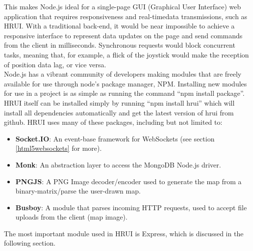 This makes Node.js ideal for a single-page GUI (Graphical User Interface) web application that requires responsiveness and 
real-timedata transmissions, such as HRUI. With a traditional back-end, it would be near impossible to achieve a responsive
interface to represent data updates on the page and send commands from the client in milliseconds. Synchronous requests would
block concurrent tasks, meaning that, for example, a flick of the joystick would make the reception of position data lag, or
vice versa.\\

Node.js has a vibrant community of developers making modules that are freely available for use through node's package manager,
NPM. Installing new modules for use in a project is as simple as running the command ``npm install package''. HRUI itself can
be installed simply by running ``npm install hrui'' which will install all dependencies automatically and get the latest
version of hrui from github. HRUI uses many of these packages, including but not limited to:
\begin{itemize}
  \item \textbf{Socket.IO}: An event-base framework for WebSockets (see section \ref{html5websockets} for more).
  \item \textbf{Monk}: An abstraction layer to access the MongoDB Node.js driver.
  \item \textbf{PNGJS}: A PNG Image decoder/encoder used to generate the map from a binary-matrix/parse the user-drawn map.
  \item \textbf{Busboy}: A module that parses incoming HTTP requests, used to accept file uploads from the client (map image).
\end{itemize}
The most important module used in HRUI is Express, which is discussed in the following section.
